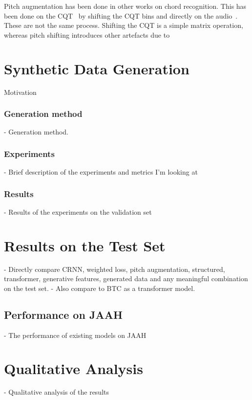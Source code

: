 Pitch augmentation has been done in other works on chord recognition. This has been done on the CQT~\citep{ACRLargeVocab1} by shifting the CQT bins and directly on the audio~\citep{BTC,StructuredTraining}. These are not the same process. Shifting the CQT is a simple matrix operation, whereas pitch shifting introduces other artefacts due to 


\section{Synthetic Data Generation}\label{sec:synthetic_data}

Motivation

\subsubsection{Generation method} 
- Generation method. 
\subsubsection{Experiments}
- Brief description of the experiments and metrics I'm looking at
\subsubsection{Results}
- Results of the experiments on the validation set

\section{Results on the Test Set}\label{sec:test-set}

- Directly compare CRNN, weighted loss, pitch augmentation, structured, transformer, generative features, generated data and any meaningful combination on the test set.
- Also compare to BTC as a transformer model.

\subsection{Performance on JAAH}
- The performance of existing models on JAAH


\section{Qualitative Analysis}
- Qualitative analysis of the results